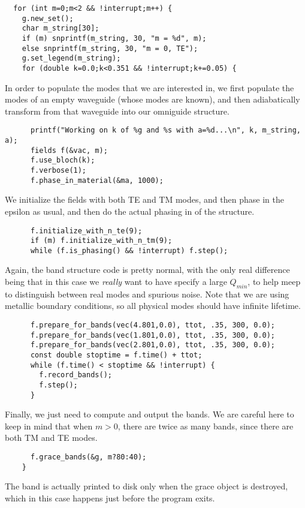 \begin{verbatim}
  for (int m=0;m<2 && !interrupt;m++) {
    g.new_set();
    char m_string[30];
    if (m) snprintf(m_string, 30, "m = %d", m);
    else snprintf(m_string, 30, "m = 0, TE");
    g.set_legend(m_string);
    for (double k=0.0;k<0.351 && !interrupt;k+=0.05) {
\end{verbatim}
In order to populate the modes that we are interested in, we first populate
the modes of an empty waveguide (whose modes are known), and then
adiabatically transform from that waveguide into our omniguide structure.
\begin{verbatim}
      printf("Working on k of %g and %s with a=%d...\n", k, m_string, a);
      fields f(&vac, m);
      f.use_bloch(k);
      f.verbose(1);
      f.phase_in_material(&ma, 1000);
\end{verbatim}
We initialize the fields with both TE and TM modes, and then phase in the
epsilon as usual, and then do the actual phasing in of the structure.
\begin{verbatim}
      f.initialize_with_n_te(9);
      if (m) f.initialize_with_n_tm(9);
      while (f.is_phasing() && !interrupt) f.step();
\end{verbatim}
Again, the band structure code is pretty normal, with the only real
difference being that in this case we \emph{really} want to have specify a
large $Q_{min}$, to help meep to distinguish between real modes and
spurious noise.  Note that we are using metallic boundary conditions, so
all physical modes should have infinite lifetime.
\begin{verbatim}
      f.prepare_for_bands(vec(4.801,0.0), ttot, .35, 300, 0.0);
      f.prepare_for_bands(vec(1.801,0.0), ttot, .35, 300, 0.0);
      f.prepare_for_bands(vec(2.801,0.0), ttot, .35, 300, 0.0);
      const double stoptime = f.time() + ttot;
      while (f.time() < stoptime && !interrupt) {
        f.record_bands();
        f.step();
      }
\end{verbatim}
Finally, we just need to compute and output the bands.  We are careful here
to keep in mind that when $m > 0$, there are twice as many bands, since
there are both TM and TE modes.
\begin{verbatim}
      f.grace_bands(&g, m?80:40);
    }
\end{verbatim}
The band is actually printed to disk only when the grace object is
destroyed, which in this case happens just before the program exits.
\begin{comment}
  }
}
\end{comment}
